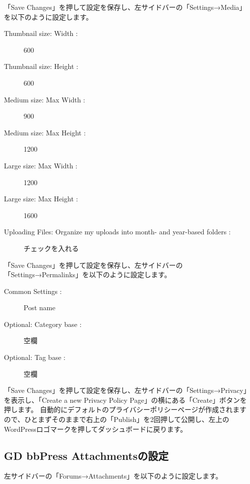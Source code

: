 \documentclass[titlepage,10pt,a4paper,uplatex]{jsbook}
\begin{document}
「Save Changes」を押して設定を保存し、左サイドバーの「Settings→Media」を以下のように設定します。

\begin{description}
\item[Thumbnail size: Width : ] 600
\item[Thumbnail size: Height : ] 600
\item[Medium size: Max Width : ] 900
\item[Medium size: Max Height : ] 1200
\item[Large size: Max Width : ] 1200
\item[Large size: Max Height : ] 1600
\item[Uploading Files: Organize my uploads into month- and year-based folders : ] チェックを入れる
\end{description}

「Save Changes」を押して設定を保存し、左サイドバーの「Settings→Permalinks」を以下のように設定します。

\begin{description}
\item[Common Settings : ] Post name
\item[Optional: Category base : ] 空欄
\item[Optional: Tag base : ] 空欄
\end{description}

「Save Changes」を押して設定を保存し、左サイドバーの「Settings→Privacy」を表示し、「Create a new Privacy Policy Page」の横にある「Create」ボタンを押します。
自動的にデフォルトのプライバシーポリシーページが作成されますので、ひとまずそのままで右上の「Publish」を2回押して公開し、左上のWordPressロゴマークを押してダッシュボードに戻ります。

\subsection{GD bbPress Attachmentsの設定}

左サイドバーの「Forums→Attachments」を以下のように設定します。
\end{document}
